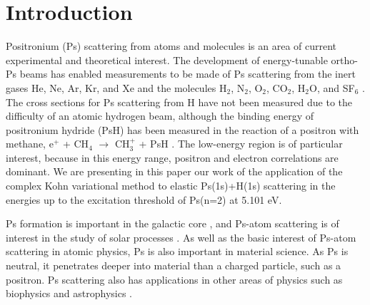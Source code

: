 \documentclass[preprint,showpacs,preprintnumbers,amsmath,amssymb,longbibliography,pra,aps]{revtex4-1}
\begin{document}
   
\maketitle

\section{\label{sec:Intro}\protect Introduction}



Positronium (Ps) scattering from atoms and molecules is an area of current experimental and theoretical interest. The development of energy-tunable ortho-Ps beams \cite{Brown1985,Laricchia1987,Zafar1996,Garner1996,Laricchia2008} has enabled measurements to be made of Ps scattering from the inert gases He, Ne, Ar, Kr, and Xe \cite{Garner1996,Garner2000,Armitage2002,Laricchia2004,Armitage2006,Laricchia2008,Engbrecht2008,Brawley2010a} and the molecules H$_2$, N$_2$, O$_2$, CO$_2$, H$_2$O, and SF$_6$ \cite{Garner1996,Garner1998,Garner2000,Laricchia2004,Armitage2006,Beale2006,Brawley2010a}. The cross sections for Ps scattering from H have not been measured due to the difficulty
of an atomic hydrogen beam, although the binding energy of positronium hydride (PsH) has been measured in the reaction of a positron with methane, e$^+$ + CH$_4$ $\to$ CH$_3^+$ + PsH \cite{Schrader1992}.
The low-energy region is of particular interest, because in this energy range, positron and electron correlations are dominant. We are presenting \cite{Conferences1,Conferences2} in this paper our work of the application of the complex Kohn variational method to elastic Ps(1s)+H(1s) scattering in the energies up to the excitation threshold of Ps(n=2) at 5.101 eV.

Ps formation is important in the galactic core \cite{Kinzer1996}, and Ps-atom scattering is of interest in the study of solar processes \cite{Crannell1976}.
As well as the basic interest of Ps-atom scattering in atomic physics,
Ps is also important in material science.
As Ps is neutral, it penetrates deeper into material than a charged particle,
such as a positron.
Ps scattering also has applications
in other areas of physics such as biophysics and astrophysics \cite{Laricchia2012}.
\end{document}
